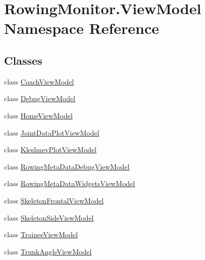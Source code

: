 \hypertarget{namespace_rowing_monitor_1_1_view_model}{}\section{Rowing\+Monitor.\+View\+Model Namespace Reference}
\label{namespace_rowing_monitor_1_1_view_model}
\subsection*{Classes}
\begin{DoxyCompactItemize}
\item 
class \hyperlink{class_rowing_monitor_1_1_view_model_1_1_coach_view_model}{Coach\+View\+Model}
\item 
class \hyperlink{class_rowing_monitor_1_1_view_model_1_1_debug_view_model}{Debug\+View\+Model}
\item 
class \hyperlink{class_rowing_monitor_1_1_view_model_1_1_home_view_model}{Home\+View\+Model}
\item 
class \hyperlink{class_rowing_monitor_1_1_view_model_1_1_joint_data_plot_view_model}{Joint\+Data\+Plot\+View\+Model}
\item 
class \hyperlink{class_rowing_monitor_1_1_view_model_1_1_kleshnev_plot_view_model}{Kleshnev\+Plot\+View\+Model}
\item 
class \hyperlink{class_rowing_monitor_1_1_view_model_1_1_rowing_meta_data_debug_view_model}{Rowing\+Meta\+Data\+Debug\+View\+Model}
\item 
class \hyperlink{class_rowing_monitor_1_1_view_model_1_1_rowing_meta_data_widgets_view_model}{Rowing\+Meta\+Data\+Widgets\+View\+Model}
\item 
class \hyperlink{class_rowing_monitor_1_1_view_model_1_1_skeleton_frontal_view_model}{Skeleton\+Frontal\+View\+Model}
\item 
class \hyperlink{class_rowing_monitor_1_1_view_model_1_1_skeleton_side_view_model}{Skeleton\+Side\+View\+Model}
\item 
class \hyperlink{class_rowing_monitor_1_1_view_model_1_1_trainee_view_model}{Trainee\+View\+Model}
\item 
class \hyperlink{class_rowing_monitor_1_1_view_model_1_1_trunk_angle_view_model}{Trunk\+Angle\+View\+Model}
\end{DoxyCompactItemize}

